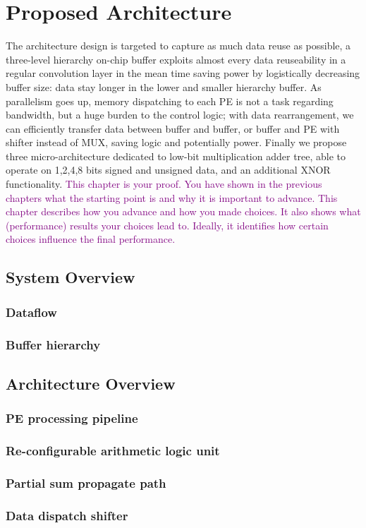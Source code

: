 \chapter{Proposed Architecture}
\label{ch:arch}
The architecture design is targeted to capture as much data reuse as possible, a three-level hierarchy on-chip buffer exploits almost every data reuseability in a regular convolution layer in the mean time saving power by logistically decreasing buffer size: data stay longer in the lower and smaller hierarchy buffer. As parallelism goes up, memory dispatching to each PE is not a task regarding bandwidth, but a huge burden to the control logic; with data rearrangement, we can efficiently transfer data between buffer and buffer, or buffer and PE with shifter instead of MUX, saving logic and potentially power. Finally we propose three micro-architecture dedicated to low-bit multiplication adder tree, able to operate on 1,2,4,8 bits signed and unsigned data, and an additional XNOR functionality.
\textcolor{purple}{This chapter is your proof. You have shown in the previous chapters what the starting point is and why it is important to advance. This chapter describes how you advance and how you made choices. It also shows what (performance) results your choices lead to. Ideally, it identifies how certain choices influence the final performance.}
\section{System Overview}
\subsection{Dataflow}
\subsection{Buffer hierarchy}
\section{Architecture Overview}
\subsection{PE processing pipeline}
\subsection{Re-configurable arithmetic logic unit}
\subsection{Partial sum propagate path}
\subsection{Data dispatch shifter}
